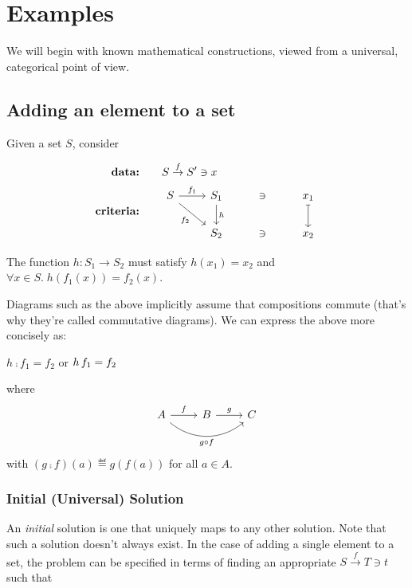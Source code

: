 \section{Examples}
We will begin with known mathematical constructions, viewed from a universal,
categorical point of view.

\subsection{Adding an element to a set}
\label{add-element-set}

Given a set $S$, consider

\begin{align*}
    \textbf{data:}&\qquad S \overset{f}{\rightarrow} S^\prime \ni x \\
    \textbf{criteria:}& \qquad
    \begin{tikzcd}[ampersand replacement=\&]
        S \arrow[r, "f_1"]
          \arrow[dr, swap, "f_2"]
          \&
        S_1 \arrow[d, "h"] \& \ni \& x_1 \arrow[d, mapsto]
          \\
          {}\&
        S_2 \& \ni \& x_2
    \end{tikzcd}
\end{align*}

The function $h : S_1 \rightarrow S_2$ must satisfy $h(x_1) = x_2$ and
$\forall x \in S .\; h(f_1(x)) = f_2(x)$.

\begin{framed}
Diagrams such as the above implicitly assume that compositions commute (that's
why they're called commutative diagrams). We can express the above more
concisely as:
\begin{center}
$h\comp f_1 = f_2$
\quad or \quad
$h\, f_1 = f_2$
\end{center}
where
$$
\begin{tikzcd}
    A \arrow[r, "f"] \arrow[rr, swap, bend right=40, "g \circ f"] & B \arrow[r, "g"] & C
\end{tikzcd}
$$
with $(g\comp f)(a)\eqdef g(f(a))$ for all $a\in A$.
\end{framed}

\subsubsection*{Initial (Universal) Solution}

An \emph{initial} solution is one that uniquely maps to any other solution.
Note that such a solution doesn't always exist. In the case of adding a single
element to a set, the problem can be specified in terms of finding an
appropriate $S \overset{f}{\rightarrow} T \ni t$ such that

